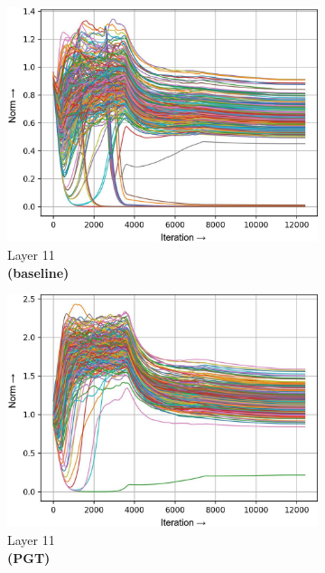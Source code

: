 \documentclass[runningheads]{llncs}
\begin{document}
\begin{figure}[t]
\centering
\captionsetup{font=footnotesize}

\begin{subfigure}[t]{0.16\textwidth}
\includegraphics[width=\textwidth]{trimmed/baseline-w-layer-4-2}
\caption{Layer 11\\ \textbf{(baseline)}
}\end{subfigure}
\begin{subfigure}[t]{0.16\textwidth}
\includegraphics[width=\textwidth]{trimmed/pgt-w-layer-4-2}
\caption{Layer 11\\ \textbf{(PGT)}
}\end{subfigure}
\begin{subfigure}[t]{0.16\textwidth}

\end{subfigure}
\end{figure}
\end{document}

